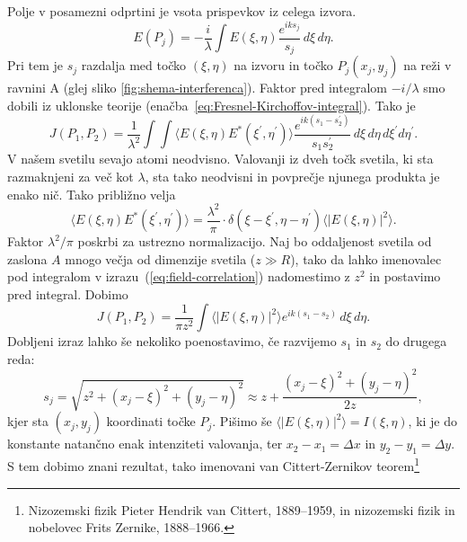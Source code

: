Polje v posamezni odprtini je vsota prispevkov iz celega izvora.
\begin{equation}
E(P_{j})=-\frac{i}{\lambda}\int E(\xi,\eta)\frac{e^{iks_{j}}}{s_{j}}\, d\xi\, d\eta.
\end{equation}
Pri tem je $s_{j}$ razdalja med točko $(\xi,\eta)$ na izvoru in točko
$P_{j}(x_{j},y_{j})$ na reži v ravnini A (glej sliko \ref{fig:shema-interferenca}).
Faktor pred integralom $-i/\lambda$ smo dobili iz uklonske teorije (enačba~\ref{eq:Fresnel-Kirchoffov-integral}).
Tako je 
\begin{equation}
J(P_{1},P_{2})=\frac{1}{\lambda^{2}}\int\int\langle E(\xi,\eta)E^{*}(\xi^{\prime},\eta^{\prime})\rangle\frac{e^{ik(s_{1}-s_{2}^{\prime})}}{s_{1}s_{2}^{\prime}}\, d\xi\, d\eta\, d\xi^{\prime}d\eta^{\prime}.\label{eq:field-correlation}
\end{equation}
V našem svetilu sevajo atomi neodvisno. Valovanji iz dveh točk svetila,
ki sta razmaknjeni za več kot $\lambda$, sta tako neodvisni in povprečje
njunega produkta je enako nič. Tako približno velja 
\begin{equation}
\langle E(\xi,\eta)E^{*}(\xi^{\prime},\eta^{\prime})\rangle=\frac{\lambda^{2}}{\pi} \cdot \delta(\xi-\xi^{\prime},\eta-\eta^{\prime})\langle|E(\xi,\eta)|^{2}\rangle.
\label{eq:delta-Zernike}
\end{equation}
Faktor $\lambda^{2}/\pi$ poskrbi za ustrezno normalizacijo. 
Naj bo oddaljenost svetila od zaslona $A$
mnogo večja od dimenzije svetila ($z\gg R$), tako da lahko imenovalec pod integralom
v izrazu~(\ref{eq:field-correlation}) nadomestimo z $z^{2}$ in postavimo
pred integral. Dobimo 
\begin{equation}
J(P_{1},P_{2})=\frac{1}{\pi z^{2}}\int\langle|E(\xi,\eta)|^{2}\rangle e^{ik(s_{1}-s_{2})}\, d\xi\, d\eta.\label{eq:Zernike1}
\end{equation}
Dobljeni izraz lahko še nekoliko poenostavimo, če razvijemo $s_{1}$
in $s_{2}$ do drugega reda: 
\begin{equation}
s_{j}=\sqrt{z^{2}+(x_{j}-\xi)^{2}+(y_{j}-\eta)^{2}}\approx z+\frac{(x_{j}-\xi)^{2}+(y_{j}-\eta)^{2}}{2z},
\end{equation}
kjer sta $(x_{j},y_{j})$ koordinati točke $P_{j}$. Pišimo 
še $\langle|E(\xi,\eta)|^{2}\rangle=I(\xi,\eta)$, ki je do konstante natančno
enak intenziteti valovanja, ter $x_{2}-x_{1}=\Delta x$
in $y_{2}-y_{1}=\Delta y$. S tem dobimo znani rezultat, tako imenovani 
van Cittert-Zernikov teorem\footnote{Nizozemski fizik Pieter Hendrik van Cittert, 1889--1959, in 
nizozemski fizik in nobelovec Frits Zernike, 1888--1966.}

